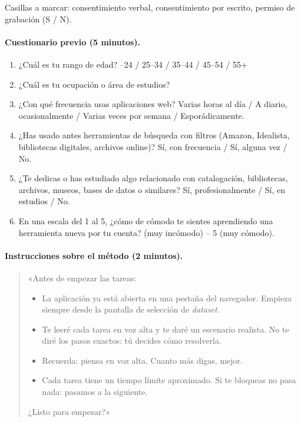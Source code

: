 Casillas a marcar: consentimiento verbal, consentimiento por escrito, permiso de grabación
(S / N).

\paragraph{Cuestionario previo (5 minutos).}
\begin{enumerate}
\item ¿Cuál es tu rango de edad? --24 / 25--34 / 35--44 / 45--54 / 55+
\item ¿Cuál es tu ocupación o área de estudios?
\item ¿Con qué frecuencia usas aplicaciones web? \quad Varias horas al día / A diario,
  ocasionalmente / Varias veces por semana / Esporádicamente.
\item ¿Has usado antes herramientas de búsqueda con filtros (Amazon, Idealista,
  bibliotecas digitales, archivos online)? \quad Sí, con frecuencia / Sí, alguna vez / No.
\item ¿Te dedicas o has estudiado algo relacionado con catalogación, bibliotecas, archivos,
  museos, bases de datos o similares? \quad Sí, profesionalmente / Sí, en estudios / No.
\item En una escala del 1 al 5, ¿cómo de cómodo te sientes aprendiendo una herramienta nueva
  por tu cuenta?  (muy incómodo) -- 5 (muy cómodo).
\end{enumerate}

\paragraph{Instrucciones sobre el método (2 minutos).}
\begin{quote}
«Antes de empezar las tareas:
\begin{itemize}
\item La aplicación ya está abierta en una pestaña del navegador. Empieza siempre desde la
  pantalla de selección de \textit{dataset}.
\item Te leeré cada tarea en voz alta y te daré un escenario realista. No te diré los pasos
  exactos: tú decides cómo resolverla.
\item Recuerda: piensa en voz alta. Cuanto más digas, mejor.
\item Cada tarea tiene un tiempo límite aproximado. Si te bloqueas no pasa nada: pasamos a
  la siguiente.
\end{itemize}
¿Listo para empezar?»
\end{quote}

